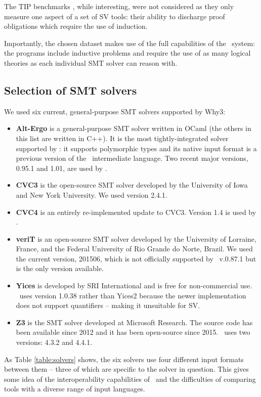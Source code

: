 The TIP benchmarks \cite{Claessen2015}, while interesting, were not considered as they only measure one aspect of a set of SV tools: their ability to discharge proof obligations which require the use of induction. 

Importantly, the chosen dataset makes use of the full capabilities of the \why~system: the programs include inductive problems and require the use of as many logical theories as each individual SMT solver can reason with.   

\subsection{Selection of \textsc{SMT} solvers}
\label{sub:smtselection}

We used six current, general-purpose SMT solvers supported by \textsf{Why3}: 
\begin{itemize}
	\item \textbf{Alt-Ergo} is a general-purpose SMT solver written in OCaml (the others in this list are written in C++). It is the most tightly-integrated solver supported by \why: it supports polymorphic types and its native input format is a previous version of the \why~intermediate language. Two recent major versions, 0.95.1 and 1.01, are used by \where.
	\item \textbf{CVC3} is the open-source SMT solver developed by the University of Iowa and New York University. We used version 2.4.1.
	\item \textbf{CVC4} is an entirely re-implemented update to CVC3. Version 1.4 is used by \where.
	\item \textbf{veriT} is an open-source SMT solver developed by the University of Lorraine, France, and the Federal University of Rio Grande do Norte, Brazil. We used the current version, 201506, which is not officially supported by \why~v.0.87.1 but is the only version available.
	\item \textbf{Yices} is developed by SRI International and is free for non-commercial use. \where~uses version 1.0.38 rather than Yices2 because the newer implementation does not support quantifiers -- making it unsuitable for SV.  
	\item \textbf{Z3} is the SMT solver developed at Microsoft Research. The source code has been available since 2012 and it has been open-source since 2015. \where~uses two versions: 4.3.2 and 4.4.1. 
\end{itemize}

As Table \ref{table:solvers} shows, the six solvers use four different input formats between them -- three of which are specific to the solver in question. 
This gives some idea of the interoperability capabilities of \why~and the difficulties of comparing tools with a diverse range of input languages. 


